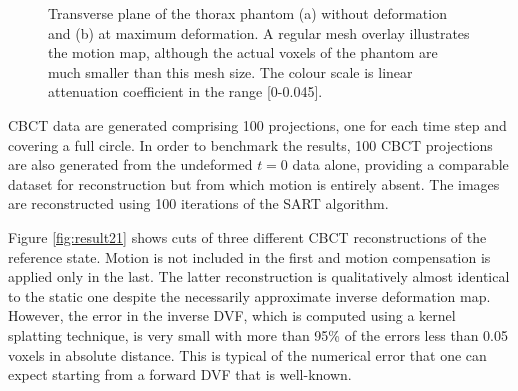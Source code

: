 \begin{figure}
\begin{center} 
\caption[Digital phantom with simulated deformation]{\label{fig:motion_Res2} Transverse plane of the thorax phantom (a) without deformation and (b) at maximum deformation.  A regular mesh overlay illustrates the motion map, although the actual voxels of the phantom are much smaller than this mesh size. The colour scale is linear attenuation coefficient in the range [0-0.045].} 
\end{center} 
\end{figure}

CBCT data are generated comprising 100 projections, one for each time step and covering a full circle.  In order to benchmark the results, 100 CBCT projections are also generated from the undeformed $t=0$ data alone, providing a comparable dataset for reconstruction but from which motion is entirely absent.  The images are reconstructed using 100 iterations of the SART algorithm.

Figure \ref{fig:result21} shows cuts of three different CBCT reconstructions of the reference state.  Motion is not included in the first and motion compensation is applied only in the last.  The latter reconstruction is qualitatively almost identical to the static one despite the necessarily approximate inverse deformation map.  However, the error in the inverse DVF, which is computed using a kernel splatting technique, is very small with more than 95\% of the errors less than 0.05 voxels in absolute distance.  This is typical of the numerical error that one can expect starting from a forward DVF that is well-known.

